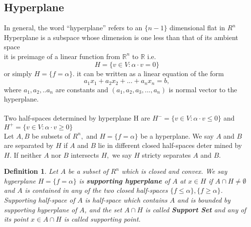 \documentclass[oneside]{book}
\newtheorem{mydef}{Definition}
\begin{document}
 
 
 
 
  



 \subsection{Hyperplane} 
 \label{ss:9}
 In general, the word “hyperplane” refers to an $\{n-1\}$ dimensional flat in $R^{n}$ \\
 Hyperplane is a subspace whose dimension is one less than that of its ambient space  
 \\ it is preimage of a  linear function from $\mathbb{R}^{n}$ to $\mathbb{R}$ i.e.
 \begin{equation}
   H=\{v \in V: \alpha \cdot v=0\} 
  \end{equation}  
    or simply  $H = \{f = \alpha \}$. 
   it can be written    as  a linear equation of the form
$$a_1x_1 + a_2x_2 + ... + a_nx_n = b,$$ where $a_1,a_2,..a_n$ are constants and $(a_1,a_2,a_3,...,a_n)$ is normal vector to the hyperplane.
\\\\
 Two half-spaces  determined by hyperplane H are 
$H^{-}=\{v \in V: \alpha \cdot v \leq 0\}$ and  $ H^{+}=\{v \in V: \alpha \cdot v \geq 0\} $ 
\\
Let $A, B$ be subsets of $R^{n},$ and $H=\{f=\alpha\}$ be a hyperplane. We say $A$ and
$B$ are separated by $H$ if $A$ and $B$ lie in different closed half-spaces deter
mined by $H .$ If neither $A$ nor $B$ intersects $H,$ we say $H$ stricty separates $A$
and $B .$\\





\begin{mydef} \label{d:3}
Let $A$ be a subset of $R^{n}$ which is closed and convex. We say hyperplane  $H=\{f=\alpha\}$ is \textbf{supporting hyperplane} of $A$ at  $x \in H$  if $A \cap H \neq \emptyset$ and $A$ is contained in any of the two closed half-spaces $\{f \leq \alpha\}, \{f \geq \alpha\}$.
\\
    Supporting half-space of $A$ is half-space which contains $A$ and is bounded by supporting hyperplane of $A$, and the set $A \cap H$ is called \textbf{Support Set} and any of its point $x \in A \cap H$ is called supporting point.
\end{mydef}
\end{document}
